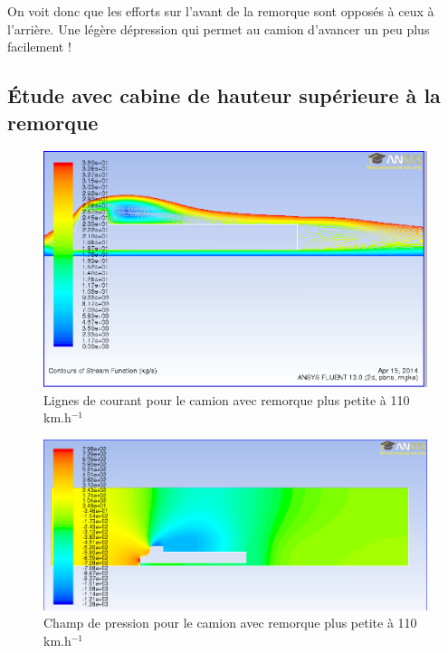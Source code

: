 On voit donc que les efforts sur l'avant de la remorque sont opposés à ceux à l'arrière. Une légère dépression qui permet au camion d'avancer un peu plus facilement ! 

\subsection{Étude avec cabine de hauteur supérieure à la remorque}
\begin{figure}[!h]
\centering
\includegraphics[scale=0.4]{resultsCx/remorque3_110stream.png}
\caption{Lignes de courant pour le camion avec remorque plus petite à 110 km.h$^{-1}$}
\label{figRem3Stream110}
\end{figure}

\begin{figure}[!h]
\centering
\includegraphics[scale=0.4]{resultsCx/rem3_press_110.png}
\caption{Champ de pression pour le camion avec remorque plus petite à 110 km.h$^{-1}$}
\label{figRem3Pres110}
\end{figure}


